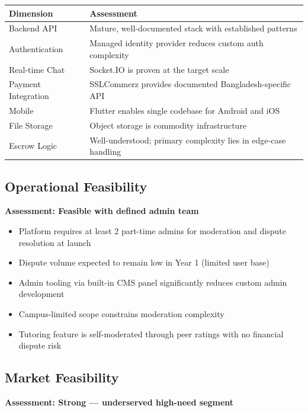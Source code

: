 \documentclass[a4paper,12pt]{article}
\begin{document}
\begin{table}[H]
\centering
\begin{tabular}{|l|p{8cm}|}
\hline
\textbf{Dimension} & \textbf{Assessment} \\
\hline
Backend API & Mature, well-documented stack with established patterns \\
Authentication & Managed identity provider reduces custom auth complexity \\
Real-time Chat & Socket.IO is proven at the target scale \\
Payment Integration & SSLCommerz provides documented Bangladesh-specific API \\
Mobile & Flutter enables single codebase for Android and iOS \\
File Storage & Object storage is commodity infrastructure \\
Escrow Logic & Well-understood; primary complexity lies in edge-case handling \\
\hline
\end{tabular}
\end{table}

\subsection{Operational Feasibility}
\textbf{Assessment: Feasible with defined admin team}

\begin{itemize}
    \item Platform requires at least 2 part-time admins for moderation and dispute resolution at launch
    \item Dispute volume expected to remain low in Year 1 (limited user base)
    \item Admin tooling via built-in CMS panel significantly reduces custom admin development
    \item Campus-limited scope constrains moderation complexity
    \item Tutoring feature is self-moderated through peer ratings with no financial dispute risk
\end{itemize}

\subsection{Market Feasibility}
\textbf{Assessment: Strong --- underserved high-need segment}
\end{document}
